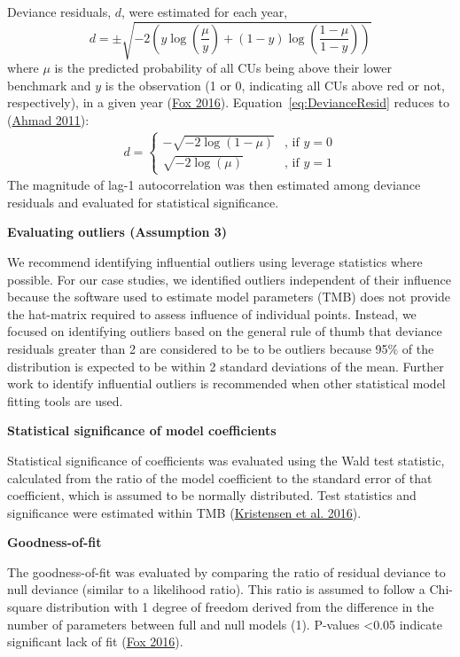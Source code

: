 \documentclass[11pt]{book}
\begin{document}
Deviance residuals, \(d\), were estimated for each year,
\begin{equation}
   d = \pm \sqrt { -2 ( y \log(\frac{\mu}{y}) + (1-y)\log(\frac{1-\mu}{1-y}) ) }
   \label{eq:DevianceResid}
\end{equation}
where \(\mu\) is the predicted probability of all CUs being above their lower benchmark and \(y\) is the observation (1 or 0, indicating all CUs above red or not, respectively), in a given year (\protect\hyperlink{ref-foxAppliedRegressionAnalysis2016}{Fox 2016}). Equation~\ref{eq:DevianceResid} reduces to (\protect\hyperlink{ref-ahmadDiagnosticResidualOutliers2011}{Ahmad 2011}):
\begin{align}
d = 
\begin{cases}
  - \sqrt { -2 \log(1-\mu) } & \text{, if } y = 0 \\
  \sqrt { -2 \log(\mu)  }  &\text{, if } y = 1
\end{cases}
  \label{eq:DevianceResidy}
\end{align}
The magnitude of lag-1 autocorrelation was then estimated among deviance residuals and evaluated for statistical significance.

\textbf{Evaluating outliers (Assumption 3)}

We recommend identifying influential outliers using leverage statistics where possible. For our case studies, we identified outliers independent of their influence because the software used to estimate model parameters (TMB) does not provide the hat-matrix required to assess influence of individual points. Instead, we focused on identifying outliers based on the general rule of thumb that deviance residuals greater than 2 are considered to be to be outliers because 95\% of the distribution is expected to be within 2 standard deviations of the mean. Further work to identify influential outliers is recommended when other statistical model fitting tools are used.

\textbf{Statistical significance of model coefficients}

Statistical significance of coefficients was evaluated using the Wald test statistic, calculated from the ratio of the model coefficient to the standard error of that coefficient, which is assumed to be normally distributed. Test statistics and significance were estimated within TMB (\protect\hyperlink{ref-kristensenTMBAutomaticDifferentiation2016}{Kristensen et al. 2016}).

\textbf{Goodness-of-fit}

The goodness-of-fit was evaluated by comparing the ratio of residual deviance to null deviance (similar to a likelihood ratio). This ratio is assumed to follow a Chi-square distribution with 1 degree of freedom derived from the difference in the number of parameters between full and null models (1). P-values \textless0.05 indicate significant lack of fit (\protect\hyperlink{ref-foxAppliedRegressionAnalysis2016}{Fox 2016}).
\end{document}
